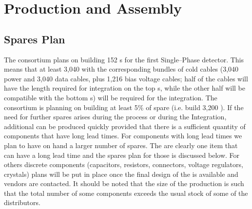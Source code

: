\section{Production and Assembly}
\label{sec:fdsp-tpcelec-production}

\subsection{Spares Plan}
\label{sec:fdsp-tpcelec-production-spares}

The  consortium plans on building 152 s
for the first Single--Phase detector. This means that at least
3,040  with the corresponding bundles of cold
cables (3,040 power and 3,040 data cables, plus 1,216 bias voltage
cables; half of the cables will have the length required for 
integration on the top s, while the other half will
be compatible with the bottom s) will be required for 
the integration. The  consortium is planning on
building at least 5\% of spare  (i.e. build 3,200
). If the need for further spares arises during the
 process or during the Integration, additional 
 can be produced quickly provided that there is
a sufficient quantity of components that have long lead times.
For components with long lead times we plan to have on hand a
larger number of spares. The  are clearly one item
that can have a long lead time and the spares plan for those is
discussed below. For others discrete components
(capacitors, resistors, connectors, voltage regulators, crystals)
plans will be put in place once the final design of the 
is available and vendors are contacted. It should be noted that the
size of the  production is such that the total number
of some components exceeds the usual stock of some of the distributors.

